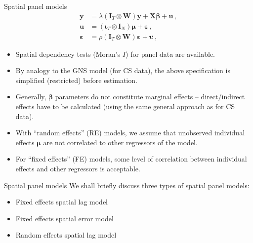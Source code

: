 \documentclass{beamer}
\newcommand{\Ms}[2]{\bm{#1}_{#2}}
\begin{document}
\begin{frame}{Spatial panel models}
\begin{equation*}
\begin{aligned}
  \bm{y}  &= 
  \lambda \left( \Ms{I}{T} \otimes \bm{W} \right) \bm{y} + \bm{X\beta} + \bm{u}\,, \\
  \bm{u} &= 
  \left( \Ms{\iota}{T} \otimes \Ms{I}{N} \right) \bm{\mu} + \bm{\varepsilon}\,, \\
  \bm{\varepsilon} &= \rho
  \left( \Ms{I}{T} \otimes \bm{W} \right) \bm{\varepsilon} + \bm{\upsilon}\,,
\end{aligned}
\end{equation*}
\begin{itemize}
    \item Spatial dependency  tests (Moran's $I$) for panel data are available.
    \smallskip
    \item By analogy to the GNS model (for CS data), the above specification is simplified (restricted) before estimation.
    \smallskip
    \item Generally, $\bm{\beta}$ parameters do not constitute marginal effects -- direct/indirect effects have to be calculated (using the same general approach as for CS data).
    \smallskip
    \item With ``random effects'' (RE) models, we assume that unobserved individual effects $\bm{\mu}$ are not correlated to other regressors of the model. 
    \smallskip
    \item For ``fixed effects'' (FE) models, some level of correlation between individual effects and other regressors is acceptable.
\end{itemize}
\end{frame}
\begin{frame}{Spatial panel models}
We shall briefly discuss three types of spatial panel models:
\bigskip
\begin{itemize}
    \item Fixed effects spatial lag model
    \medskip
    \item Fixed effects spatial error model
    \medskip
    \item Random effects spatial lag model
\end{itemize}
\end{frame}
\end{document}
